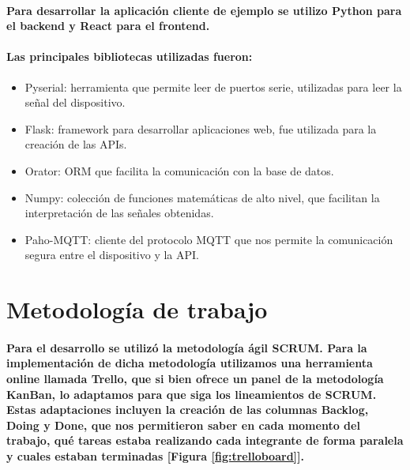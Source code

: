 \documentclass{article}
\begin{document}
\paragraph{
Para desarrollar la aplicación cliente de ejemplo se utilizo Python para el backend y React para el frontend.
}
\paragraph{
Las principales bibliotecas utilizadas fueron:
}
\begin{itemize}
    \item Pyserial: herramienta que permite leer de puertos serie, utilizadas para leer la señal del dispositivo.
    \item Flask: framework para desarrollar aplicaciones web, fue utilizada para la creación de las APIs.
    \item Orator: ORM que facilita la comunicación con la base de datos.
    \item Numpy: colección de funciones matemáticas de alto nivel, que facilitan la interpretación de las señales obtenidas.
    \item Paho-MQTT: cliente del protocolo MQTT que nos permite la comunicación segura entre el dispositivo y la API.
\end{itemize}

\section{Metodología de trabajo}
\paragraph{
Para el desarrollo se utilizó la metodología ágil SCRUM. Para la implementación de dicha metodología utilizamos una herramienta online llamada Trello, que si bien ofrece un panel de la metodología KanBan, lo adaptamos para que siga los lineamientos de SCRUM. Estas adaptaciones incluyen la creación de las columnas Backlog, Doing y Done, que nos permitieron saber en cada momento del trabajo, qué tareas estaba realizando cada integrante de forma paralela y cuales estaban terminadas [Figura \ref{fig:trelloboard}].
}
\end{document}
